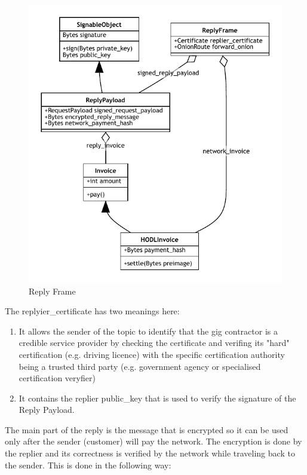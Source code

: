 \documentclass{article}
\begin{document}
\begin{figure}
	\centering
	\includegraphics[scale=1.0]{ReplyFrame.pdf}
	\caption{Reply Frame}
	\label{fig:fr:replyframe}
\end{figure}

The replyier\_certificate has two meanings here:

\begin{enumerate}
	\item It allows the sender of the topic to identify that the gig contractor is a credible service provider by checking the certificate and verifing its "hard" certification (e.g. driving licence) with the specific certification authority being a trusted third party (e.g. government agency or specialised certification veryfier)
	\item It contains the replier public\_key that is used to verify the signature of the Reply Payload.
\end{enumerate}

The main part of the reply is the message that is encrypted so it can be used only after the sender (customer) will pay the network. The encryption is done by the replier and its correctness is verified by the network while traveling back to the sender. This is done in the following way:
\end{document}
